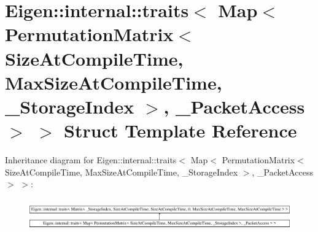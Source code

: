 \hypertarget{struct_eigen_1_1internal_1_1traits_3_01_map_3_01_permutation_matrix_3_01_size_at_compile_time_0013e0044a37b24d59a079ebbe4c707a56}{}\section{Eigen\+::internal\+::traits$<$ Map$<$ Permutation\+Matrix$<$ Size\+At\+Compile\+Time, Max\+Size\+At\+Compile\+Time, \+\_\+\+Storage\+Index $>$, \+\_\+\+Packet\+Access $>$ $>$ Struct Template Reference}
\label{struct_eigen_1_1internal_1_1traits_3_01_map_3_01_permutation_matrix_3_01_size_at_compile_time_0013e0044a37b24d59a079ebbe4c707a56}
Inheritance diagram for Eigen\+::internal\+::traits$<$ Map$<$ Permutation\+Matrix$<$ Size\+At\+Compile\+Time, Max\+Size\+At\+Compile\+Time, \+\_\+\+Storage\+Index $>$, \+\_\+\+Packet\+Access $>$ $>$\+:\begin{figure}[H]
\begin{center}
\leavevmode
\includegraphics[height=1.357576cm]{struct_eigen_1_1internal_1_1traits_3_01_map_3_01_permutation_matrix_3_01_size_at_compile_time_0013e0044a37b24d59a079ebbe4c707a56}
\end{center}
\end{figure}

